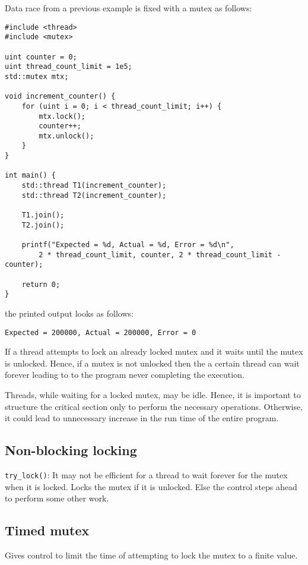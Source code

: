\documentclass{scrartcl}
\begin{document}
Data race from a previous example is fixed with a mutex as follows:

\begin{verbatim}
#include <thread>
#include <mutex>

uint counter = 0;
uint thread_count_limit = 1e5;
std::mutex mtx;

void increment_counter() {
    for (uint i = 0; i < thread_count_limit; i++) {
        mtx.lock();
        counter++;
        mtx.unlock();
    }
}

int main() {
    std::thread T1(increment_counter);
    std::thread T2(increment_counter);

    T1.join();
    T2.join();

    printf("Expected = %d, Actual = %d, Error = %d\n", 
        2 * thread_count_limit, counter, 2 * thread_count_limit - counter);

    return 0;
}
\end{verbatim}

the printed output looks as follows:
\begin{verbatim}
Expected = 200000, Actual = 200000, Error = 0
\end{verbatim}

If a thread attempts to lock an already locked mutex and it waits until the mutex is unlocked. Hence, if a mutex is not unlocked then the a certain thread can wait forever leading to to the program never completing the execution.

Threads, while waiting for a locked mutex, may be idle. Hence, it is important to structure the critical section only to perform the necessary operations. Otherwise, it could lead to unnecessary increase in the run time of the entire program. 

\subsection{Non-blocking locking}

\texttt{try_lock()}: It may not be efficient for a thread to wait forever for the mutex when it is locked. Locks the mutex if it is unlocked. Else the control steps ahead to perform some other work.

\subsection{Timed mutex}
Gives control to limit the time of attempting to lock the mutex to a finite value.
\end{document}

